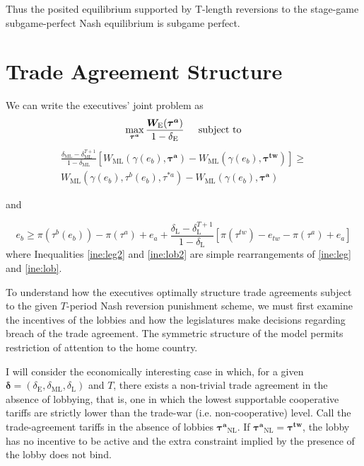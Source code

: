 \documentclass[authoryear, review]{elsarticle}
\newcommand{\bta}{\bm{\tau^a}}
\newcommand{\ga}{\gamma}
\newcommand{\btw}{\bm{\tau^{tw}}}
\newcommand{\de}{\delta}
\begin{document}
Thus the posited equilibrium supported by T-length reversions to the stage-game subgame-perfect Nash equilibrium is subgame perfect.

\section{Trade Agreement Structure}
\label{sec:structure}
We can write the executives' joint problem as
\begin{equation}
  \max_{\bta} \frac{\bm{W_\text{E}}(\bta)}{1-\de_\text{E}} \hskip.2in \text{subject to}
  \label{prob:max}
\end{equation}
\begin{multline}
  \frac{\de_\text{ML} - \de_\text{ML}^{T+1}}{1-\de_\text{ML}} \left[W_\text{ML}(\ga(e_b),\bta) - W_{\text{ML}}(\ga(e_b),\btw) \right] \geq \\
	W_{\text{ML}}(\ga(e_b),\tau^b(e_b),\tau^{*a}) - W_{\text{ML}}(\ga(e_b),\bta)
  \label{ine:leg2}
\end{multline}
\begin{center}
and
\end{center}
\begin{equation}
  e_b \geq \pi(\tau^b(e_b)) - \pi(\tau^a) + e_a + \frac{\de_\text{L} - \de_\text{L}^{T+1}}{1-\de_\text{L}} \left[\pi(\tau^{tw}) -e_{tw} - \pi(\tau^a) + e_a\right]
  \label{ine:lob2}
\end{equation}
where Inequalities \ref{ine:leg2} and \ref{ine:lob2} are simple rearrangements of \ref{ine:leg} and \ref{ine:lob}.

To understand how the executives optimally structure trade agreements subject to the given $T$-period Nash reversion punishment scheme, we must first examine the incentives of the lobbies and how the legislatures make decisions regarding breach of the trade agreement. The symmetric structure of the model permits restriction of attention to the home country.

I will consider the economically interesting case in which, for a given $\bm{\de}=\left(\de_\text{E},\de_\text{ML},\de_\text{L}\right)$ and $T$, there exists a non-trivial trade agreement in the absence of lobbying, that is, one in which the lowest supportable cooperative tariffs are strictly lower than the trade-war (i.e. non-cooperative) level. Call the trade-agreement tariffs in the absence of lobbies $\bta_{\text{NL}}$. If $\bta_{\text{NL}} = \btw$, the lobby has no incentive to be active and the extra constraint implied by the presence of the lobby does not bind.
\end{document}
